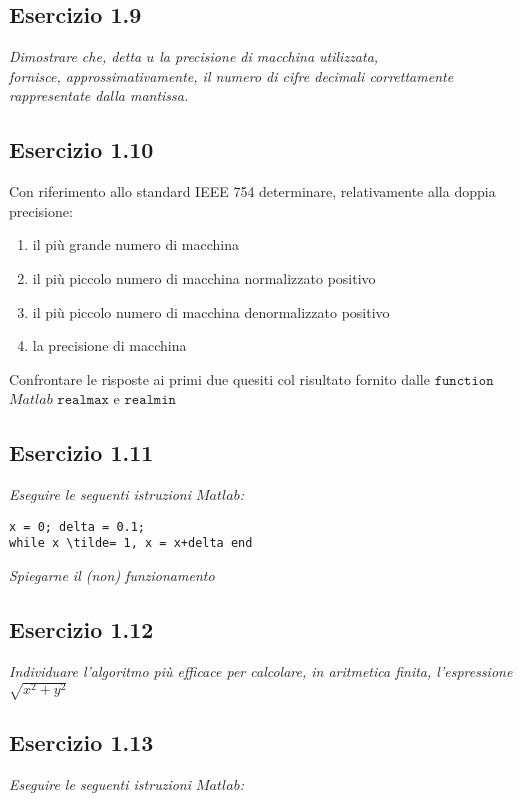 \subsection{Esercizio 1.9}
\emph{Dimostrare che, detta $ u $ la precisione di macchina utilizzata, \\
\flushleft fornisce, approssimativamente, il numero di cifre decimali correttamente rappresentate dalla mantissa.}

\subsection{Esercizio 1.10}
Con riferimento allo standard IEEE 754 determinare, relativamente alla doppia precisione:\\
\begin{enumerate}
  	\item il più grande numero di macchina
  	\item il più piccolo numero di macchina normalizzato positivo
	\item il più piccolo numero di macchina denormalizzato positivo
	\item la precisione di macchina
\end{enumerate}
Confrontare le risposte ai primi due quesiti col risultato fornito dalle $\mathtt{function}$ $Matlab$ $\mathtt{realmax}$ e $\mathtt{realmin}$

\subsection{Esercizio 1.11}
\emph{Eseguire le seguenti istruzioni $Matlab$:}

\lstset{language=Matlab}
\begin{lstlisting}
x = 0; delta = 0.1;
while x \tilde= 1, x = x+delta end
\end{lstlisting}
\emph{Spiegarne il (non) funzionamento}

\subsection{Esercizio 1.12}
\emph{Individuare l'algoritmo più efficace per calcolare, in aritmetica finita, l'espressione $\sqrt{x^{2} + y^{2}}$}

\subsection{Esercizio 1.13}
\emph{Eseguire le seguenti istruzioni $Matlab$:}

